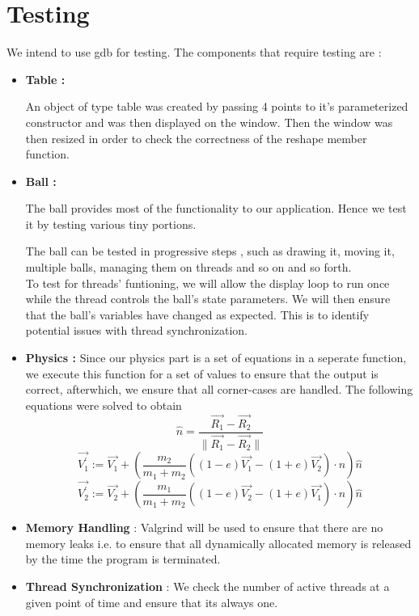 \documentclass[]{article}
\begin{document}
\section{Testing}

We intend to use gdb for testing. The components that require testing are :

\begin{itemize}



\item \textbf{Table :}

An object of type table was created by passing 4 points to it's parameterized constructor and was then displayed on the window. Then the window was then resized in order to check the correctness of the reshape member function.

\item \textbf{Ball :}

The ball provides most of the functionality to our application. Hence we test it by testing various tiny portions.

The ball can be tested in progressive steps , such as drawing it, moving it, multiple balls, managing them on threads and so on and so forth. \\

To test for threads' funtioning, we will allow the display loop to run once while the thread controls the ball's state parameters. We will then ensure that the ball's variables have changed as expected. This is to identify potential issues with thread synchronization.

\item \textbf{Physics :} Since our physics part is a set of equations in a seperate function, we execute this function for a set of values to ensure that the output is correct, afterwhich, we ensure that all corner-cases are handled.
The following equations were solved to obtain 
\begin{equation}
\hat{n} = \frac{\vec{R_{1}} - \vec{R_{2}}}{ \parallel \vec{R_{1}} - \vec{R_{2}} \parallel}
\end{equation}
\begin{equation}
\vec{V_{1}^{'}} := \vec{V_{1}} + (\frac{m_{2}}{m_{1} + m_{2}}((1-e)\vec{V_{1}} - (1+e)\vec{V_{2}})\cdotp\hat{n})\hat{n}
\end{equation}
\begin{equation}
\vec{V_{2}^{'}} := \vec{V_{2}} + (\frac{m_{1}}{m_{1} + m_{2}}((1-e)\vec{V_{2}} - (1+e)\vec{V_{1}})\cdotp\hat{n})\hat{n}
\end{equation}



\item \textbf{Memory Handling} : Valgrind will be used to ensure that there are no memory leaks i.e. to ensure that all dynamically allocated memory is released by the time the program is terminated.

\item \textbf{Thread Synchronization} : We check the number of active threads at a given point of time and ensure that its always one.


\end{itemize}
\end{document}
